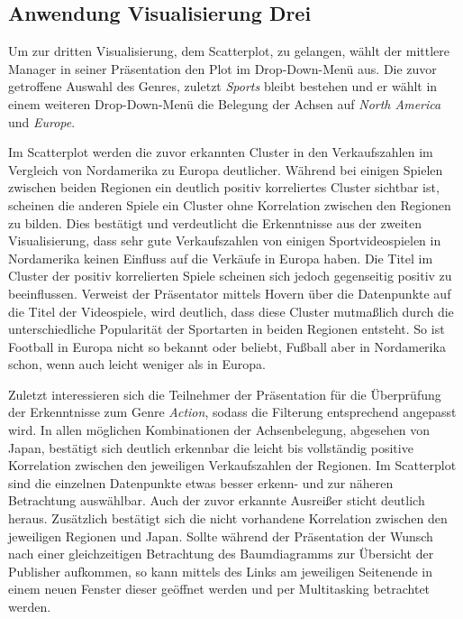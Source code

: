 \documentclass[usegeometry=true]{scrartcl}
\begin{document}
\subsection{Anwendung Visualisierung Drei}
Um zur dritten Visualisierung, dem Scatterplot, zu gelangen, wählt der mittlere Manager in seiner Präsentation den Plot im Drop-Down-Menü aus.
Die zuvor getroffene Auswahl des Genres, zuletzt \textit{Sports} bleibt bestehen und er wählt in einem weiteren Drop-Down-Menü die Belegung der Achsen auf \textit{North America} und \textit{Europe}.

Im Scatterplot werden die zuvor erkannten Cluster in den Verkaufszahlen im Vergleich von Nordamerika zu Europa deutlicher. 
Während bei einigen Spielen zwischen beiden Regionen ein deutlich positiv korreliertes Cluster sichtbar ist, scheinen die anderen Spiele ein Cluster ohne Korrelation zwischen den Regionen zu bilden.
Dies bestätigt und verdeutlicht die Erkenntnisse aus der zweiten Visualisierung, dass sehr gute Verkaufszahlen von einigen Sportvideospielen in Nordamerika keinen Einfluss auf die Verkäufe in Europa haben. 
Die Titel im Cluster der positiv korrelierten Spiele scheinen sich jedoch gegenseitig positiv zu beeinflussen. 
Verweist der Präsentator mittels Hovern über die Datenpunkte auf die Titel der Videospiele, wird deutlich, dass diese Cluster mutmaßlich durch die unterschiedliche Popularität der Sportarten in beiden Regionen entsteht. 
So ist Football in Europa nicht so bekannt oder beliebt, Fußball aber in Nordamerika schon, wenn auch leicht weniger als in Europa.

Zuletzt interessieren sich die Teilnehmer der Präsentation für die Überprüfung der Erkenntnisse zum Genre \textit{Action}, sodass die Filterung entsprechend angepasst wird. 
In allen möglichen Kombinationen der Achsenbelegung, abgesehen von Japan, bestätigt sich deutlich erkennbar die leicht bis vollständig positive Korrelation zwischen den jeweiligen Verkaufszahlen der Regionen.
Im Scatterplot sind die einzelnen Datenpunkte etwas besser erkenn- und zur näheren Betrachtung auswählbar. 
Auch der zuvor erkannte Ausreißer sticht deutlich heraus. 
Zusätzlich bestätigt sich die nicht vorhandene Korrelation zwischen den jeweiligen Regionen und Japan.
Sollte während der Präsentation der Wunsch nach einer gleichzeitigen Betrachtung des Baumdiagramms zur Übersicht der Publisher aufkommen, so kann mittels des Links am jeweiligen Seitenende in einem neuen Fenster dieser geöffnet werden und per Multitasking betrachtet werden.
\end{document}

